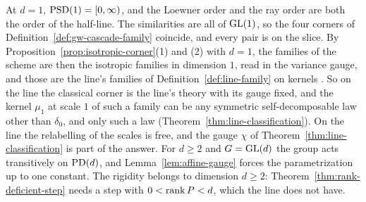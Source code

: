 \begin{remark}\label{rem:classical-line}
At $d = 1$, $\mathrm{PSD}(1) = [0,\infty)$, and the Loewner order and the ray order are both the order of
the half-line. The similarities are all of $\mathrm{GL}(1)$, so the four corners of
Definition~\ref{def:gw-cascade-family} coincide, and every pair is on the slice. By
Proposition~\ref{prop:isotropic-corner}(1) and (2) with $d = 1$, the families of the scheme are then
the isotropic families in dimension $1$, read in the variance gauge, and those are the line's
families of Definition~\ref{def:line-family} on kernels .
So on the
line the classical corner is the line's theory with its gauge fixed, and the kernel $\mu_1$ at
scale $1$ of such a family can be any symmetric self-decomposable law other than $\delta_0$, and
only such a law (Theorem~\ref{thm:line-classification}). On the line the relabelling of the scales
is free, and the gauge $\chi$ of Theorem~\ref{thm:line-classification} is part of the answer. For $d \ge 2$ and
$G = \mathrm{GL}(d)$ the group acts transitively on $\mathrm{PD}(d)$, and Lemma~\ref{lem:affine-gauge} forces the
parametrization up to one constant. The rigidity belongs to dimension $d \ge 2$:
Theorem~\ref{thm:rank-deficient-step} needs a step with $0 < \operatorname{rank} P < d$, which the line does not
have.
\end{remark}
